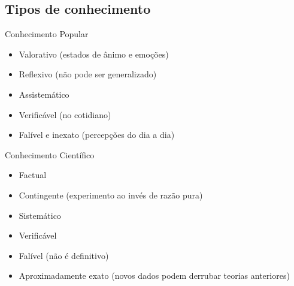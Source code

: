\documentclass{beamer}
\begin{document}
\subsection{Tipos de conhecimento}



\begin{frame}{Conhecimento Popular}
  \begin{itemize}
  \item Valorativo (estados de ânimo e emoções)
  \item Reflexivo (não pode ser generalizado)
  \item Assistemático
  \item Verificável (no cotidiano)
  \item Falível e inexato (percepções do dia a dia)
  \end{itemize}
\end{frame}

\begin{frame}{Conhecimento Científico}
  \begin{itemize}
  \item Factual
  \item Contingente (\alert{experimento} ao invés de razão pura)
  \item Sistemático 
  \item \alert{Verificável}
  \item Falível (não é definitivo)
  \item Aproximadamente exato (novos dados podem derrubar teorias
    anteriores)
  \end{itemize}
\end{frame}
\end{document}
